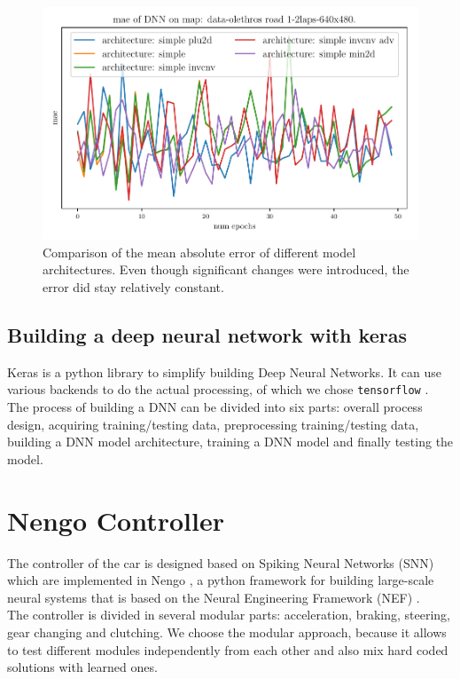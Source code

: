 \documentclass[10pt,a4paper,twoside,journal]{IEEEtran}
\begin{document}
\begin{figure}[ht]
	\centering
	\includegraphics[width=\columnwidth]{attachments/simple-val_mae-architecture_comp-02697-52797-65029-75770-89095.pdf}
	\caption{Comparison of the mean absolute error of different model architectures. Even though significant changes were introduced, the error did stay relatively constant.}
	\label{fig:model-architecture-comparison}
\end{figure}

\subsection{Building a deep neural network with keras}
\label{ssc:keras}
Keras \cite{Toshev_2014_CVPR} is a python library to simplify building Deep Neural Networks. It can use various backends to do the actual processing, of which we chose \texttt{tensorflow} \cite{tensorflow2015-whitepaper}. The process of building a DNN can be divided into six parts: overall process design, acquiring training/testing data, preprocessing training/testing data, building a DNN model architecture, training a DNN model and finally testing the model.

\section{Nengo Controller}
\label{sc:controller}
The controller of the car is designed based on Spiking Neural Networks (SNN) which are implemented in Nengo \cite{nengo}, a python framework for building large-scale neural systems that is based on the Neural Engineering Framework (NEF) \cite{nef}. \\
The controller is divided in several modular parts: acceleration, braking, steering, gear changing and clutching. We choose the modular approach, because it allows to test different modules independently from each other and also mix hard coded solutions with learned ones.
\end{document}
